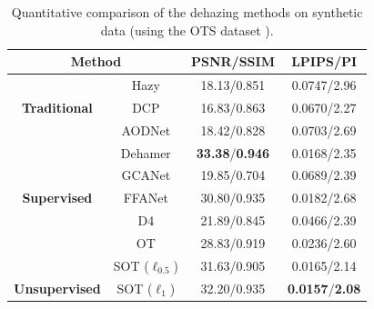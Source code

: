 \documentclass[10pt,journal,compsoc]{IEEEtran}
\begin{document}
\begin{table}[!t]
	\renewcommand\arraystretch{2}
	\footnotesize
	\centering
	\caption{Quantitative comparison of the dehazing methods on synthetic data
 (using the OTS dataset \cite{li2018benchmarking}).}
        \begin{tabular}{|cc|c|c|}
		\hline
		\multicolumn{2}{|c|}{\textbf{Method}}                           					 & \textbf{PSNR/SSIM}       & \textbf{LPIPS/PI} \\ \hline
		\multicolumn{1}{|c|}{\textbf{}}                        & Hazy                           & 18.13/0.851                       & 0.0747/2.96                         \\ \hline
		\multicolumn{1}{|c|}{\textbf{Traditional}}                    & DCP\cite{he2010single}                            & 16.83/0.863                        & 0.0670/2.27
                                         \\ \hline
		\multicolumn{1}{|c|}{}                                 & AODNet\cite{aodnet}                         & 18.42/0.828                        & 0.0703/2.69                                        \\ \cline{2-4} 
		\multicolumn{1}{|c|}{}                                 & Dehamer\cite{dehamer}                        & \textbf{33.38}/\textbf{0.946}                        & 0.0168/2.35                                        \\ \cline{2-4} 
		\multicolumn{1}{|c|}{}                                 & GCANet\cite{gcanet}                         & 19.85/0.704                        & 0.0689/2.39                                         \\ \cline{2-4} 
		\multicolumn{1}{|c|}{\multirow{-4}{*}{\textbf{Supervised}}}  & FFANet\cite{ffanet}                         & 30.80/0.935                        & 0.0182/2.68                                         \\ \hline
		\multicolumn{1}{|c|}{}                                 & D4\cite{d4}                            & 21.89/0.845                        & 0.0466/2.39                                         \\ \cline{2-4} 
		\multicolumn{1}{|c|}{}                                 & OT\cite{wang2022optimal}                        & 28.83/0.919                        & 0.0236/2.60                                         \\ \cline{2-4} 
		\multicolumn{1}{|c|}{}                                 & SOT ($\ell_{0.5}$)                        & 31.63/0.905                        & 0.0165/2.14                                         \\ \cline{2-4} 
		\multicolumn{1}{|c|}{\multirow{-4}{*}{\textbf{Unsupervised}}} & SOT ($\ell_{1}$)				    & 32.20/0.935						& \textbf{0.0157}/\textbf{2.08}                  						\\ \hline
	\end{tabular}
\end{table}
\end{document}
